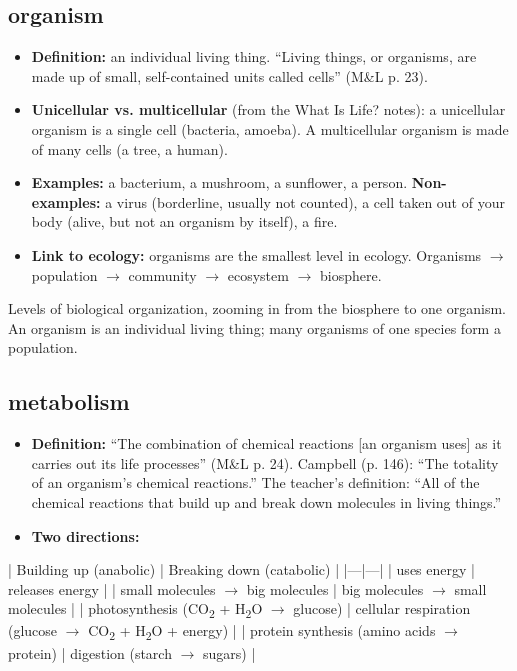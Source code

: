 \documentclass[11pt,letterpaper]{article}
\begin{document}
\subsection{organism}
\begin{itemize}
  \item \textbf{Definition:} an individual living thing. ``Living things, or organisms, are made up of small, self-contained units called cells'' (M\&L p. 23).
  \item \textbf{Unicellular vs. multicellular} (from the What Is Life? notes): a unicellular organism is a single cell (bacteria, amoeba). A multicellular organism is made of many cells (a tree, a human).
  \item \textbf{Examples:} a bacterium, a mushroom, a sunflower, a person. \textbf{Non-examples:} a virus (borderline, usually not counted), a cell taken out of your body (alive, but not an organism by itself), a fire.
  \item \textbf{Link to ecology:} organisms are the smallest level in ecology. Organisms $\rightarrow$ population $\rightarrow$ community $\rightarrow$ ecosystem $\rightarrow$ biosphere.
\end{itemize}

  {Levels of biological organization, zooming in from the biosphere to one organism. An organism is an individual living thing; many organisms of one species form a population.}

\subsection{metabolism}
\begin{itemize}
  \item \textbf{Definition:} ``The combination of chemical reactions [an organism uses] as it carries out its life processes'' (M\&L p. 24). Campbell (p. 146): ``The totality of an organism's chemical reactions.'' The teacher's definition: ``All of the chemical reactions that build up and break down molecules in living things.''
  \item \textbf{Two directions:}
\end{itemize}

  | Building up (anabolic) | Breaking down (catabolic) |   |---|---|   | uses energy | releases energy |   | small molecules $\rightarrow$ big molecules | big molecules $\rightarrow$ small molecules |   | photosynthesis (CO\textsubscript{2} + H\textsubscript{2}O $\rightarrow$ glucose) | cellular respiration (glucose $\rightarrow$ CO\textsubscript{2} + H\textsubscript{2}O + energy) |   | protein synthesis (amino acids $\rightarrow$ protein) | digestion (starch $\rightarrow$ sugars) |
\end{document}
